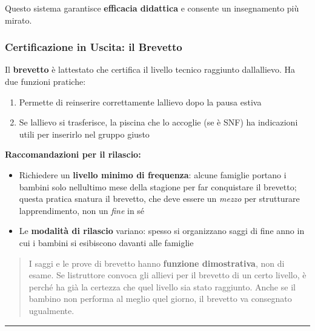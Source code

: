 \documentclass[a4paper,11pt]{article}
\providecommand{\tightlist}{%
  \setlength{\itemsep}{0pt}\setlength{\parskip}{0pt}}
\begin{document}
Questo sistema garantisce \textbf{efficacia didattica} e consente un
insegnamento più mirato.

\subsubsection{Certificazione in Uscita: il
      Brevetto}\label{certificazione-in-uscita-il-brevetto}

Il \textbf{brevetto} è l\textquotesingle attestato che certifica il
livello tecnico raggiunto dall\textquotesingle allievo. Ha due funzioni
pratiche:

\begin{enumerate}
      \tightlist
      \item
            Permette di reinserire correttamente l\textquotesingle allievo dopo la
            pausa estiva
      \item
            Se l\textquotesingle allievo si trasferisce, la piscina che lo
            accoglie (se è SNF) ha indicazioni utili per inserirlo nel gruppo
            giusto
\end{enumerate}

\textbf{Raccomandazioni per il rilascio:}

\begin{itemize}
      \tightlist
      \item
            Richiedere un \textbf{livello minimo di frequenza}: alcune famiglie
            portano i bambini solo nell\textquotesingle ultimo mese della stagione
            per far conquistare il brevetto; questa pratica snatura il brevetto,
            che deve essere un \emph{mezzo} per strutturare
            l\textquotesingle apprendimento, non un \emph{fine} in sé
      \item
            Le \textbf{modalità di rilascio} variano: spesso si organizzano saggi
            di fine anno in cui i bambini si esibiscono davanti alle famiglie
\end{itemize}

\begin{quote}
      I saggi e le prove di brevetto hanno \textbf{funzione dimostrativa}, non
      di esame. Se l\textquotesingle istruttore convoca gli allievi per il
      brevetto di un certo livello, è perché ha già la certezza che quel
      livello sia stato raggiunto. Anche se il bambino non performa al meglio
      quel giorno, il brevetto va consegnato ugualmente.
\end{quote}

\begin{center}\rule{0.5\linewidth}{0.5pt}\end{center}
\end{document}
